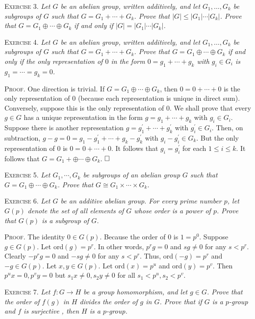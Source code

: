\documentclass[11pt, leqno]{article}
\newcommand{\done}{\ensuremath{\hfill\square}}
\begin{document}
\textsc{Exercise 3}. \emph{Let $G$ be an abelian group, written additively, and let $G_1, \ldots, G_k$ be subgroups of $G$ such that $G = G_1 + \cdots + G_k$. Prove that $|G| \leq |G_1|\cdots |G_k|$. Prove that $G = G_1 \oplus \cdots \oplus G_k$ if and only if $|G| = |G_1|\cdots |G_k|$.}

\textsc{Exercise 4}. \emph{Let $G$ be an abelian group, written additively, and let $G_1, \ldots, G_k$ be subgroups of $G$ such that $G = G_1 + \cdots + G_k$. Prove that $G = G_1 \oplus \cdots \oplus G_k$ if and only if the only representation of $0$ in the form $0 = g_1 + \cdots + g_k$ with $g_i \in G_i$ is $g_1 = \cdots = g_k = 0$.}

\textsc{Proof}. One direction is trivial. If $G = G_1 \oplus \cdots \oplus G_k$, then $0 = 0 + \cdots + 0$ is the only representation of $0$ (because each representation is unique in direct sum). Conversely, suppose this is the only representation of $0$. We shall prove that every $g \in G$ has a unique representation in the form $g = g_1 + \cdots + g_k$ with $g_i \in G_i$. Suppose there is another representation $g = g_1^{\prime} + \cdots + g_k^{\prime}$ with $g_i^{\prime} \in G_i$. Then, on subtraction, $g - g = 0 = g_1 - g_1^{\prime} + \cdots + g_k - g_k^{\prime}$ with $g_i - g_i^{\prime} \in G_k$. But the only representation of $0$ is $0 = 0 + \cdots + 0$. It follows that $g_i = g_i^{\prime}$ for each $1 \leq i \leq k$. It follows that $G = G_1 + \oplus \cdots \oplus G_k$. \done

\textsc{Exercise 5}. \emph{Let $G_1, \cdots, G_k$ be subgroups of an abelian group $G$ such that $G = G_1 \oplus \cdots \oplus G_k$. Prove that $G \cong G_1 \times \cdots \times G_k$.}

\textsc{Exercise 6}. \emph{Let $G$ be an additive abelian group. For every prime number $p$, let $G(p)$ denote the set of all elements of $G$ whose order is a power of $p$. Prove that $G(p)$ is a subgroup of $G$.}

\textsc{Proof}. The identity $0 \in G(p)$. Because the order of $0$ is $1 = p^0$. Suppose $g \in G(p)$. Let ord$(g) = p^r$. In other words, $p^rg = 0$ and $sg \ne 0$ for any $s < p^r$. Clearly $-p^rg = 0$ and $-sg \ne 0$ for any $s < p^r$. Thus, ord$(-g) = p^r$ and $-g \in G(p)$. Let $x, y \in G(p)$. Let ord$(x) = p^u$ and ord$(y) = p^v$. Then $p^ux = 0, p^vy = 0$ but $s_1x \ne 0, s_2y \ne 0$ for all $s_1 < p^u, s_2 < p^v$.

\textsc{Exercise 7}. \emph{Let $f: G \to H$ be a group homomorphism, and let $g\in G$. Prove that the order of $f(g)$ in $H$ divides the order of $g$ in $G$. Prove that if $G$ is a $p$-group and $f$ is surjective , then $H$ is a $p$-group.}
\end{document}

